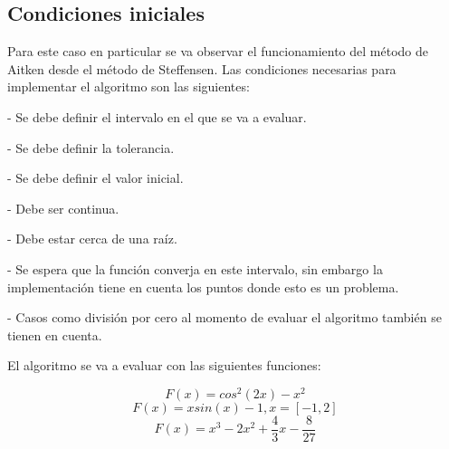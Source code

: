 \documentclass[]{hdsr}
\begin{document}
\subsection{Condiciones iniciales}
Para este caso en particular se va observar el funcionamiento del método de Aitken desde el método de Steffensen. Las condiciones necesarias para implementar el algoritmo son las siguientes:\newline

- Se debe definir el intervalo en el que se va a evaluar.\newline

- Se debe definir la tolerancia.\newline

- Se debe definir el valor inicial.\newline

- Debe ser continua.\newline

- Debe estar cerca de una raíz.\newline

- Se espera que la función converja en este intervalo, sin embargo la implementación tiene en cuenta los puntos donde esto es un problema. \newline

- Casos como división por cero al momento de evaluar el algoritmo también se tienen en cuenta. \newline

El algoritmo se va a evaluar con las siguientes funciones:\newline

\begin{equation}
    {F(x)} = cos^2(2x)-x^2
\end{equation}
\begin{equation}
    {F(x)} = xsin(x)-1,     x = [-1, 2]
\end{equation}
\begin{equation}
    {F(x)} = x^3 -2x^2 + \frac{4}{3}x - \frac{8}{27}
\end{equation}
\end{document}
